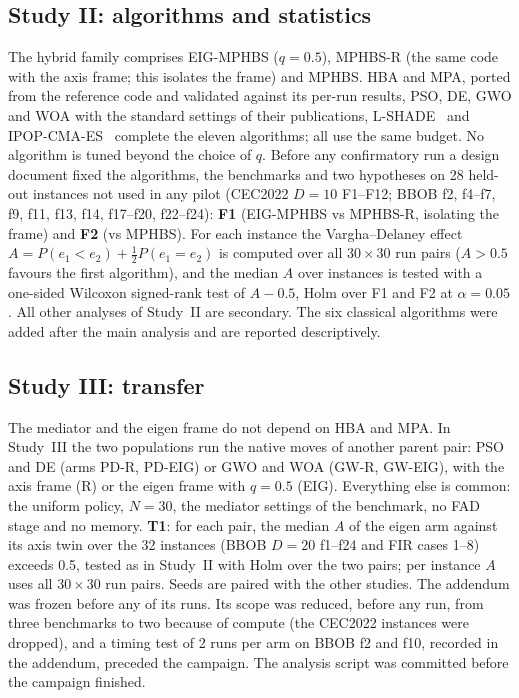 \subsection{Study II: algorithms and statistics}
The hybrid family comprises EIG-MPHBS ($q=0.5$), MPHBS-R (the same code with the axis frame; this isolates the frame) and
MPHBS. HBA and MPA, ported from the reference code and validated against its per-run results, PSO, DE, GWO and WOA with
the standard settings of their publications, L-SHADE~\citep{tanabe2014lshade} and IPOP-CMA-ES~\citep{hansen2001cma,
auger2005ipop,hansen2019pycma} complete the eleven algorithms; all use the same budget. No algorithm is tuned beyond the
choice of $q$. Before any confirmatory run a design document fixed the algorithms, the benchmarks and two hypotheses on 28
held-out instances not used in any pilot (CEC2022 $D=10$ F1--F12; BBOB f2, f4--f7, f9, f11, f13, f14, f17--f20, f22--f24):
\textbf{F1} (EIG-MPHBS vs MPHBS-R, isolating the frame) and \textbf{F2} (vs MPHBS). For each instance the Vargha--Delaney
effect $A=P(e_1<e_2)+\frac12P(e_1=e_2)$ is computed over all $30\times30$ run pairs ($A>0.5$ favours the first algorithm), and
the median $A$ over instances is tested with a one-sided Wilcoxon signed-rank test of $A-0.5$, Holm over F1 and F2 at
$\alpha=0.05$. All other analyses of Study~II are secondary. The six classical algorithms were added after the main analysis
and are reported descriptively.

\subsection{Study III: transfer}
\label{sec:designIII}
The mediator and the eigen frame do not depend on HBA and MPA. In Study~III the two populations run the native moves of
another parent pair: PSO and DE (arms PD-R, PD-EIG) or GWO and WOA (GW-R, GW-EIG), with the axis frame (R) or the eigen
frame with $q=0.5$ (EIG). Everything else is common: the uniform policy, $N=30$, the mediator settings of the benchmark, no
FAD stage and no memory. \textbf{T1}: for each pair, the median $A$ of the eigen arm against its axis twin over the 32
instances (BBOB $D=20$ f1--f24 and FIR cases 1--8) exceeds 0.5, tested as in Study~II with Holm over the two pairs; per
instance $A$ uses all $30\times30$ run pairs. Seeds are paired with the other studies. The addendum was frozen before any of
its runs. Its scope was reduced, before any run, from three benchmarks to two because of compute (the CEC2022 instances were
dropped), and a timing test of 2 runs per arm on BBOB f2 and f10, recorded in the addendum, preceded the campaign. The
analysis script was committed before the campaign finished.

